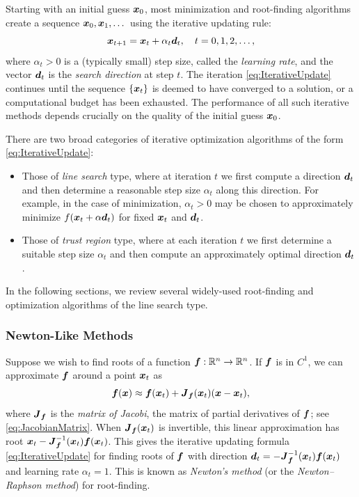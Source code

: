 Starting with an initial guess \(\boldsymbol{x}_0\), most minimization and root-finding algorithms create a sequence \(\boldsymbol{x}_0, \boldsymbol{x}_1, \dots\) using the iterative updating rule:
\begin{equation}
	\boldsymbol{x}_{t+1} = \boldsymbol{x}_t + \alpha_t \boldsymbol{d}_t, \quad t = 0, 1, 2, \dots, \label{eq:IterativeUpdate}
\end{equation}
where \(\alpha_t > 0\) is a (typically small) step size, called the \textit{learning rate}, and the vector \(\boldsymbol{d}_t\) is the \textit{search direction} at step \(t\). The iteration \cref{eq:IterativeUpdate} continues until the sequence \(\{\boldsymbol{x}_t\}\) is deemed to have converged to a solution, or a computational budget has been exhausted. The performance of all such iterative methods depends crucially on the quality of the initial guess \(\boldsymbol{x}_0\).

There are two broad categories of iterative optimization algorithms of the form \cref{eq:IterativeUpdate}:
\begin{itemize}
	\item Those of \textit{line search} type, where at iteration \(t\) we first compute a direction \(\boldsymbol{d}_t\) and then determine a reasonable step size \(\alpha_t\) along this direction. For example, in the case of minimization, \(\alpha_t > 0\) may be chosen to approximately minimize \(f(\boldsymbol{x}_t + \alpha \boldsymbol{d}_t)\) for fixed \(\boldsymbol{x}_t\) and \(\boldsymbol{d}_t\).
	\item Those of \textit{trust region} type, where at each iteration \(t\) we first determine a suitable step size \(\alpha_t\) and then compute an approximately optimal direction \(\boldsymbol{d}_t\).
\end{itemize}

In the following sections, we review several widely-used root-finding and optimization algorithms of the line search type.

\subsubsection{Newton-Like Methods}
Suppose we wish to find roots of a function \(\boldsymbol{f} : \mathbb{R}^n \to \mathbb{R}^n\). If \(\boldsymbol{f}\) is in \(C^1\), we can approximate \(\boldsymbol{f}\) around a point \(\boldsymbol{x}_t\) as
\begin{equation*}
	\boldsymbol{f}(\boldsymbol{x}) \approx \boldsymbol{f}(\boldsymbol{x}_t) + \boldsymbol{J}_{\boldsymbol{f}}(\boldsymbol{x}_t)(\boldsymbol{x} - \boldsymbol{x}_t),
\end{equation*}
where \(\boldsymbol{J}_{\boldsymbol{f}}\) is the \textit{matrix of Jacobi}, the matrix of partial derivatives of \(\boldsymbol{f}\); see \cref{eq:JacobianMatrix}. When \(\boldsymbol{J}_{\boldsymbol{f}}(\boldsymbol{x}_t)\) is invertible, this linear approximation has root \(\boldsymbol{x}_t - \boldsymbol{J}_{\boldsymbol{f}}^{-1}(\boldsymbol{x}_t) \boldsymbol{f}(\boldsymbol{x}_t)\). This gives the iterative updating formula \cref{eq:IterativeUpdate} for finding roots of \(\boldsymbol{f}\) with direction \(\boldsymbol{d}_t = -\boldsymbol{J}_{\boldsymbol{f}}^{-1}(\boldsymbol{x}_t) \boldsymbol{f}(\boldsymbol{x}_t)\) and learning rate \(\alpha_t = 1\). This is known as \textit{Newton's method} (or the \textit{Newton--Raphson method}) for root-finding.

